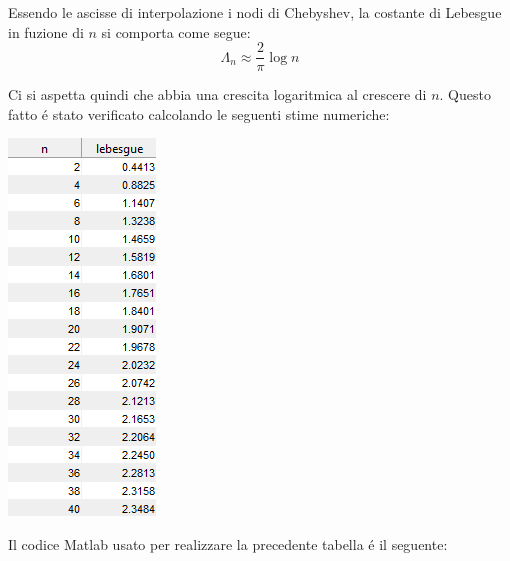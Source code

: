 \begin{center}
\footnotesize\noindent{}\end{center}

\noindent Essendo le ascisse di interpolazione i nodi di Chebyshev, la costante di Lebesgue in fuzione di \(n\) si comporta come segue:
\[
\Lambda_n \approx \frac{2}{\pi}\log n
\]

\noindent Ci si aspetta quindi che abbia una crescita logaritmica al crescere di \(n\). Questo fatto \'e stato verificato calcolando le seguenti stime numeriche:

\begin{center}
	\includegraphics[scale=0.7]{cap4/4_8.png}
\end{center}

\noindent Il codice Matlab usato per realizzare la precedente tabella \'e il seguente:


